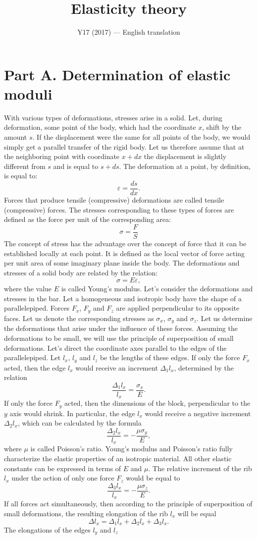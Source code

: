 \documentclass[11pt,a4paper]{article}
\title{\textbf{Elasticity theory}}
\author{\normalsize Y17 (2017) --- English translation}
\date{}
\begin{document}
\maketitle

\section*{Part A. Determination of elastic moduli}

With various types of deformations, stresses arise in a solid. Let, during deformation, some point of the body, which had the coordinate $x$, shift by the amount $s$. If the displacement were the same for all points of the body, we would simply get a parallel transfer of the rigid body. Let us therefore assume that at the neighboring point with coordinate $x+ dx$ the displacement is slightly different from $s$ and is equal to $s+ds$. The deformation at a point, by definition, is equal to: \[\varepsilon = \frac{ds}{dx}.\]Forces that produce tensile (compressive) deformations are called tensile (compressive) forces. The stresses corresponding to these types of forces are defined as the force per unit of the corresponding area: \[\sigma = \frac{F}{S}\]The concept of stress has the advantage over the concept of force that it can be established locally at each point. It is defined as the local vector of force acting per unit area of some imaginary plane inside the body. The deformations and stresses of a solid body are related by the relation: \[\sigma = E\varepsilon,\]where the value $E$ is called Young’s modulus. Let's consider the deformations and stresses in the bar. Let a homogeneous and isotropic body have the shape of a parallelepiped. Forces $F_x$, $F_y$ and $F_z$ are applied perpendicular to its opposite faces. Let us denote the corresponding stresses as $\sigma_x$, $\sigma_y$ and $\sigma_z$. Let us determine the deformations that arise under the influence of these forces. Assuming the deformations to be small, we will use the principle of superposition of small deformations. Let's direct the coordinate axes parallel to the edges of the parallelepiped. Let $l_x$, $l_y$ and $l_z$ be the lengths of these edges. If only the force $F_x$ acted, then the edge $l_x$ would receive an increment $\Delta_1 l_x$, determined by the relation \[\frac{\Delta_1 l_x}{l_x} =\frac{\sigma_x}{E}.\]If only the force $F_y$ acted, then the dimensions of the block, perpendicular to the $y$ axis would shrink. In particular, the edge $l_x$ would receive a negative increment $\Delta_2 l_x$, which can be calculated by the formula \[\frac{\Delta_2 l_x}{l_x} = - \frac{\mu \sigma_y}{E},\]where $\mu$ is called Poisson's ratio. Young's modulus and Poisson's ratio fully characterize the elastic properties of an isotropic material. All other elastic constants can be expressed in terms of $E$ and $\mu$. The relative increment of the rib $l_x$ under the action of only one force $F_z$ would be equal to \[\frac{\Delta_3 l_x}{l_x} =-\frac{\mu \sigma_z}{E}.\]If all forces act simultaneously, then according to the principle of superposition of small deformations, the resulting elongation of the rib $l_x$ will be equal \[\Delta l_x=\Delta_1 l_x+\Delta_2 l_x+\Delta_3 l_x.\] The elongations of the edges $l_y$ and $l_z$ 
\end{document}

